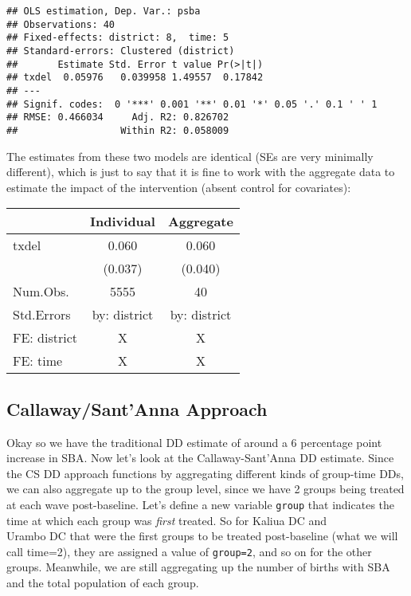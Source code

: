 \documentclass[
]{article}
\begin{document}
\begin{verbatim}
## OLS estimation, Dep. Var.: psba
## Observations: 40 
## Fixed-effects: district: 8,  time: 5
## Standard-errors: Clustered (district) 
##       Estimate Std. Error t value Pr(>|t|) 
## txdel  0.05976   0.039958 1.49557  0.17842 
## ---
## Signif. codes:  0 '***' 0.001 '**' 0.01 '*' 0.05 '.' 0.1 ' ' 1
## RMSE: 0.466034     Adj. R2: 0.826702
##                  Within R2: 0.058009
\end{verbatim}

The estimates from these two models are identical (SEs are very
minimally different), which is just to say that it is fine to work with
the aggregate data to estimate the impact of the intervention (absent
control for covariates):

\begin{table}
\centering
\begin{tabular}[t]{lcc}
\toprule
  & Individual & Aggregate\\
\midrule
txdel & \num{0.060} & \num{0.060}\\
 & (\num{0.037}) & (\num{0.040})\\
\midrule
Num.Obs. & \num{5555} & \num{40}\\
Std.Errors & by: district & by: district\\
FE: district & X & X\\
FE: time & X & X\\
\bottomrule
\end{tabular}
\end{table}

\hypertarget{callawaysantanna-approach}{%
\subsection{Callaway/Sant'Anna
Approach}\label{callawaysantanna-approach}}

Okay so we have the traditional DD estimate of around a 6 percentage
point increase in SBA. Now let's look at the Callaway-Sant'Anna DD
estimate. Since the CS DD approach functions by aggregating different
kinds of group-time DDs, we can also aggregate up to the group level,
since we have 2 groups being treated at each wave post-baseline. Let's
define a new variable \texttt{group} that indicates the time at which
each group was \emph{first} treated. So for Kaliua DC and\\
Urambo DC that were the first groups to be treated post-baseline (what
we will call time=2), they are assigned a value of \texttt{group=2}, and
so on for the other groups. Meanwhile, we are still aggregating up the
number of births with SBA and the total population of each group.
\end{document}
